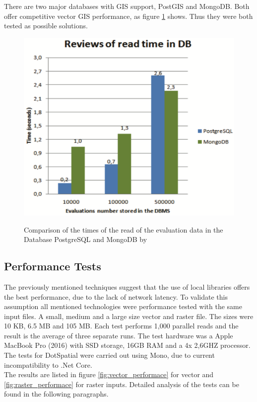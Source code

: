 There are two major databases with GIS support, PostGIS and MongoDB. Both offer competitive vector GIS performance, as figure \ref{img:mongo-vs-postgres} shows. Thus they were both tested as possible solutions.

\begin{figure}[H]
	\centering
	\includegraphics[width=0.6\columnwidth]{res/mongo-vs-postgres}\\
	\caption[]{Comparison of the times of the read of the evaluation data in the Database PostgreSQL and MongoDB by \cite{Maia2016}}
	\label{img:mongo-vs-postgres}
\end{figure}


\subsection{Performance Tests}
The previously mentioned techniques suggest that the use of local libraries offers the best performance, due to the lack of network latency. To validate this assumption all mentioned technologies were performance tested with the same input files. A small, medium and a large size vector and raster file. The sizes were 10 KB, 6.5 MB and 105 MB. Each test performs 1,000 parallel reads and the result is the average of three separate runs. The test hardware was a Apple MacBook Pro (2016) with SSD storage, 16GB RAM and a 4x 2,6GHZ processor. The tests for DotSpatial were carried out using Mono, due to current incompatibility to .Net Core.\\
The results are listed in figure \ref{fig:vector_performace} for vector and \ref{fig:raster_performace} for raster inputs. Detailed analysis of the tests can be found in the following paragraphs.

